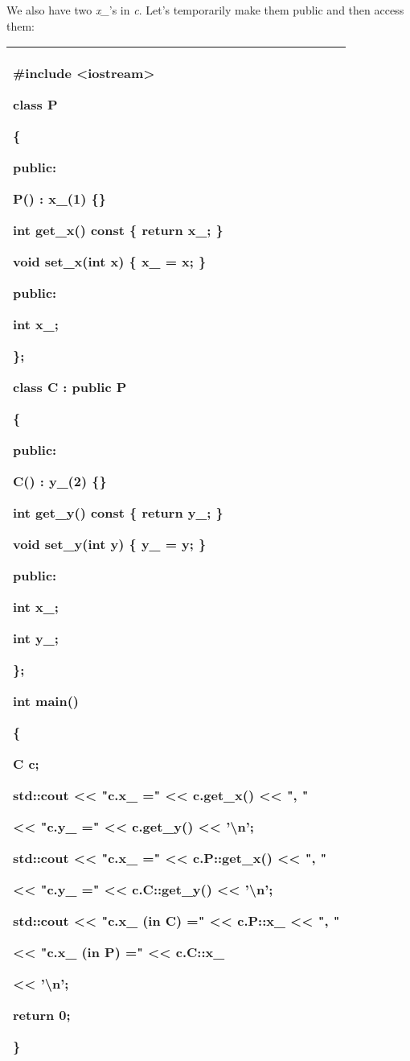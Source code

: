 \documentclass[
]{article}
\begin{document}
We also have two \emph{x\_}'s in \emph{c}. Let's temporarily make them
public and then access them:

\begin{longtable}[]{@{}l@{}}
\toprule
\endhead
\begin{minipage}[t]{0.97\columnwidth}\raggedright
\#include \textless iostream\textgreater{}

class P

\{

public:

P() : x\_(1) \{\}

int get\_x() const \{ return x\_; \}

void set\_x(int x) \{ x\_ = x; \}

public:

int x\_;

\};

class C : public P

\{

public:

C() : y\_(2) \{\}

int get\_y() const \{ return y\_; \}

void set\_y(int y) \{ y\_ = y; \}

public:

int x\_;

int y\_;

\};

int main()

\{

C c;

std::cout \textless\textless{} "c.x\_ =" \textless\textless{} c.get\_x()
\textless\textless{} ", "

\textless\textless{} "c.y\_ =" \textless\textless{} c.get\_y()
\textless\textless{} '\textbackslash n';

std::cout \textless\textless{} "c.x\_ =" \textless\textless{}
c.P::get\_x() \textless\textless{} ", "

\textless\textless{} "c.y\_ =" \textless\textless{} c.C::get\_y()
\textless\textless{} '\textbackslash n';

std::cout \textless\textless{} "c.x\_ (in C) =" \textless\textless{}
c.\textbf{P::x\_} \textless\textless{} ", "

\textless\textless{} "c.x\_ (in P) =" \textless\textless{}
c.\textbf{C::x\_}

\textless\textless{} '\textbackslash n';

return 0;

\}\strut
\end{minipage}\tabularnewline
\bottomrule
\end{longtable}
\end{document}
